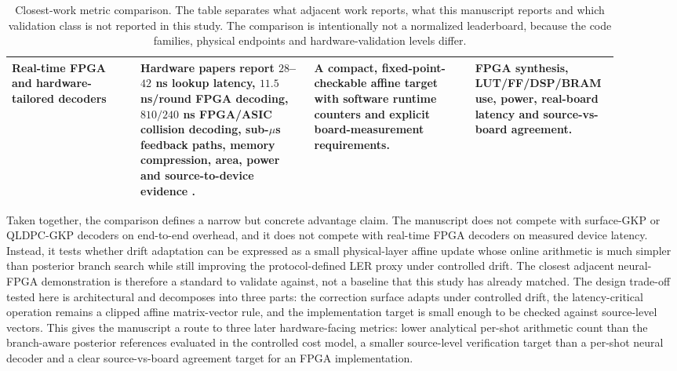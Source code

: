 \documentclass[11pt]{article}
\begin{document}
\begin{table}[t]
\begin{tabular}{@{}>{\raggedright\arraybackslash}p{0.20\linewidth}>{\raggedright\arraybackslash}p{0.27\linewidth}>{\raggedright\arraybackslash}p{0.25\linewidth}>{\raggedright\arraybackslash}p{0.18\linewidth}@{}}
\addlinespace
Real-time FPGA and hardware-tailored decoders & Hardware papers report \(28\)--\(42\) ns lookup latency, \(11.5\) ns/round FPGA decoding, \(810/240\) ns FPGA/ASIC collision decoding, sub-\(\mu\)s feedback paths, memory compression, area, power and source-to-device evidence \cite{lilliput2022,helios2023,qldpcfpga2025,caune2024,ziad2024,maurer2025,yang2026}. & A compact, fixed-point-checkable affine target with software runtime counters and explicit board-measurement requirements. & FPGA synthesis, LUT/FF/DSP/BRAM use, power, real-board latency and source-vs-board agreement. \\
\bottomrule
\end{tabular}
\caption{Closest-work metric comparison.  The table separates what adjacent
work reports, what this manuscript reports and which validation class is not
reported in this study.  The comparison is intentionally not a normalized leaderboard,
because the code families, physical endpoints and hardware-validation levels
differ.}
\label{tab:closest-work-positioning}
\end{table}

Taken together, the comparison defines a narrow but concrete advantage claim.
The manuscript does not compete with surface-GKP or QLDPC-GKP decoders on
end-to-end overhead, and it does not compete with real-time FPGA decoders on
measured device latency.  Instead, it tests whether drift adaptation can be
expressed as a small physical-layer affine update whose online arithmetic is
much simpler than posterior branch search while still improving the
protocol-defined LER proxy under controlled drift.  The closest adjacent
neural-FPGA demonstration is therefore a standard to validate against, not a
baseline that this study has already matched.  The design trade-off tested
here is architectural and decomposes into three parts:
the correction surface adapts under controlled drift, the latency-critical
operation remains a clipped affine matrix-vector rule, and the implementation
target is small enough to be checked against source-level vectors.  This gives
the manuscript a route to three later hardware-facing metrics: lower
analytical per-shot arithmetic count than the branch-aware posterior references
evaluated in the controlled cost model, a smaller source-level verification
target than a per-shot neural decoder and
a clear source-vs-board agreement target for an FPGA implementation.
\end{document}
